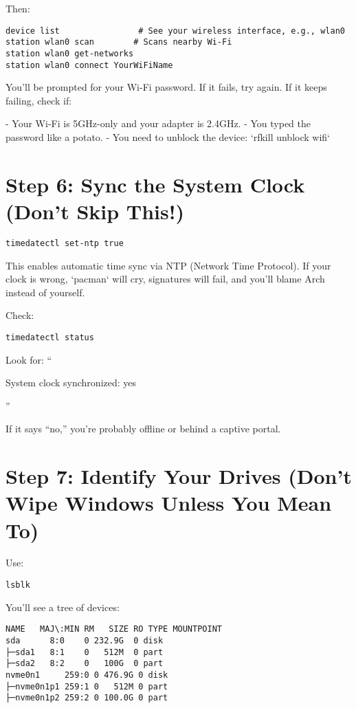 \documentclass[12pt]{book}
\begin{document}
Then:

\begin{lstlisting}
device list                # See your wireless interface, e.g., wlan0
station wlan0 scan        # Scans nearby Wi-Fi
station wlan0 get-networks
station wlan0 connect YourWiFiName
\end{lstlisting}

You’ll be prompted for your Wi-Fi password.  
If it fails, try again. If it keeps failing, check if:

- Your Wi-Fi is 5GHz-only and your adapter is 2.4GHz.
- You typed the password like a potato.
- You need to unblock the device: `rfkill unblock wifi`

\section*{Step 6: Sync the System Clock (Don’t Skip This!)}

\begin{lstlisting}
timedatectl set-ntp true
\end{lstlisting}

This enables automatic time sync via NTP (Network Time Protocol). If your clock is wrong, `pacman` will cry, signatures will fail, and you’ll blame Arch instead of yourself.

Check:
\begin{lstlisting}
timedatectl status
\end{lstlisting}

Look for:
``

System clock synchronized: yes

''

If it says “no,” you’re probably offline or behind a captive portal.

\section*{Step 7: Identify Your Drives (Don't Wipe Windows Unless You Mean To)}

Use:
\begin{lstlisting}
lsblk
\end{lstlisting}

You'll see a tree of devices:

\begin{lstlisting}
NAME   MAJ\:MIN RM   SIZE RO TYPE MOUNTPOINT
sda      8:0    0 232.9G  0 disk
├─sda1   8:1    0   512M  0 part
├─sda2   8:2    0   100G  0 part
nvme0n1     259:0 0 476.9G 0 disk
├─nvme0n1p1 259:1 0   512M 0 part
├─nvme0n1p2 259:2 0 100.0G 0 part

\end{lstlisting}
\end{document}
